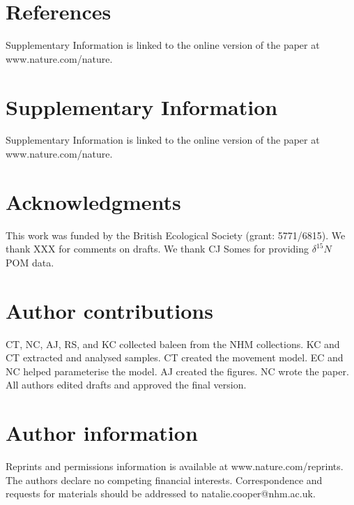 \documentclass[a4paper,12pt]{article}
\begin{document}
\section{References}




Supplementary Information is linked to the online version of the paper at www.nature.com/nature.

\section{Supplementary Information}
Supplementary Information is linked to the online version of the paper at www.nature.com/nature.

\section{Acknowledgments}
This work was funded by the British Ecological Society (grant: 5771/6815). 
We thank XXX for comments on drafts.
We thank CJ Somes for providing  $\delta^15N$ POM data.

\section{Author contributions}
CT, NC, AJ, RS, and KC collected baleen from the NHM collections. 
KC and CT extracted and analysed samples.
CT created the movement model.
EC and NC helped parameterise the model.
AJ created the figures. 
NC wrote the paper.
All authors edited drafts and approved the final version.

\section{Author information}
Reprints and permissions information is available at www.nature.com/reprints.
The authors declare no competing financial interests.
Correspondence and requests for materials should be addressed to natalie.cooper@nhm.ac.uk.





\end{document}
